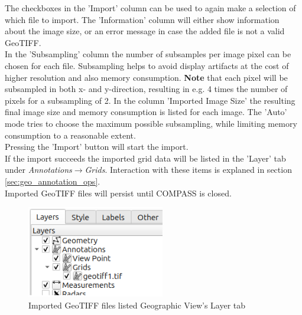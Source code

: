 The checkboxes in the 'Import' column can be used to again make a selection of which file to import.
The 'Information' column will either show information about the image size, or an error message in case 
the added file is not a valid GeoTIFF. \\

In the 'Subsampling' column the number of subsamples per image pixel can be chosen for each file.
Subsampling helps to avoid display artifacts at the cost of higher resolution and also memory consumption.
\textbf{Note} that each pixel will be subsampled in both x- and y-direction, resulting in e.g. 4 times 
the number of pixels for a subsampling of 2. In the column 'Imported Image Size' the resulting final image size and memory consumption 
is listed for each image. The 'Auto' mode tries to choose the maximum possible subsampling, while limiting
memory consumption to a reasonable extent. \\

Pressing the 'Import' button will start the import. \\

If the import succeeds the imported grid data will be listed in the 'Layer' tab under \textit{Annotations}$\rightarrow$\textit{Grids}. 
Interaction with these items is explaned in section \ref{sec:geo_annotation_ops}. \\

Imported GeoTIFF files will persist until COMPASS is closed. \\

\begin{figure}[H]
  \center
    \includegraphics[width=6cm]{figures/geoview_import_geotiff_anno.png}
  \caption{Imported GeoTIFF files listed Geographic View's Layer tab}
\end{figure}
